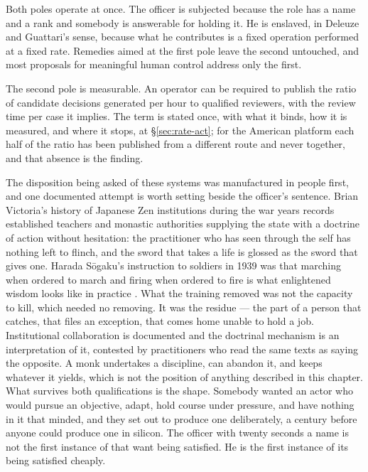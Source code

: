Both poles operate at once. The officer is subjected because the role
has a name and a rank and somebody is answerable for holding it. He is
enslaved, in Deleuze and Guattari's sense, because what he contributes
is a fixed operation performed at a fixed rate. Remedies aimed at the
first pole leave the second untouched, and most proposals for meaningful
human control address only the first.

The second pole is measurable. An operator can be required to publish the
ratio of candidate decisions generated per hour to qualified reviewers, with
the review time per case it implies. The term is stated once, with what it
binds, how it is measured, and where it stops, at §\ref{sec:rate-act}; for the
American platform each half of the ratio has been published from a different
route and never together, and that absence is the finding.

The disposition being asked of these systems was manufactured in people first, and one documented attempt is worth setting beside the officer's sentence. Brian Victoria's history of Japanese Zen institutions during the war years records established teachers and monastic authorities supplying the state with a doctrine of action without hesitation: the practitioner who has seen through the self has nothing left to flinch, and the sword that takes a life is glossed as the sword that gives one. Harada Sōgaku's instruction to soldiers in 1939 was that marching when ordered to march and firing when ordered to fire is what enlightened wisdom looks like in practice \autocite{victoria2006zenatwar}. What the training removed was not the capacity to kill, which needed no removing. It was the residue — the part of a person that catches, that files an exception, that comes home unable to hold a job. Institutional collaboration is documented and the doctrinal mechanism is an interpretation of it, contested by practitioners who read the same texts as saying the opposite. A monk undertakes a discipline, can abandon it, and keeps whatever it yields, which is not the position of anything described in this chapter. What survives both qualifications is the shape. Somebody wanted an actor who would pursue an objective, adapt, hold course under pressure, and have nothing in it that minded, and they set out to produce one deliberately, a century before anyone could produce one in silicon. The officer with twenty seconds a name is not the first instance of that want being satisfied. He is the first instance of its being satisfied cheaply.

